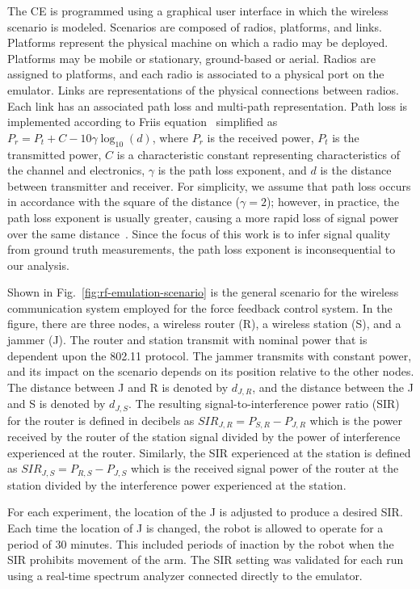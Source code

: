 The CE is programmed using a graphical user interface in which the wireless scenario is modeled.  Scenarios are composed of radios, platforms, and links.  Platforms represent the physical machine on which a radio may be deployed.  Platforms may be mobile or stationary, ground-based or aerial. Radios are assigned to platforms, and each radio is associated to a physical port on the emulator.  Links are representations of the physical connections between radios.  Each link has an associated path loss and multi-path representation.  Path loss is implemented according to Friis equation~\cite{Shaw2013.Frii} simplified as 
$P_r = P_t + C - 10\gamma\log_{10}\left( d \right)$, 
where $P_r$ is the received power, $P_t$ is the transmitted power, $C$ is a characteristic constant representing characteristics of the channel and electronics, $\gamma$ is the path loss exponent, and $d$ is the distance between transmitter and receiver.  For simplicity, we assume that path loss occurs in accordance with the square of the distance ($\gamma=2$); however, in practice, the path loss exponent is usually greater, causing a more rapid loss of signal power over the same distance~\cite{Candell2017.NIST1951}.  Since the focus of this work is to infer signal quality from ground truth measurements, the path loss exponent is inconsequential to our analysis.


Shown in Fig.~\ref{fig:rf-emulation-scenario} is the general scenario for the wireless communication system employed for the force feedback control system.  In the figure, there are three nodes, a wireless router (R), a wireless station (S), and a jammer (J).  The router and station transmit with nominal power that is dependent upon the 802.11 protocol. The jammer transmits with constant power, and its impact on the scenario depends on its position relative to the other nodes.  The distance between J and R is denoted by $d_{J,R}$, and the distance between the J and S is denoted by $d_{J,S}$.  The resulting signal-to-interference power ratio (SIR) for the router is defined in decibels as $SIR_{J,R} = P_{S,R}-P_{J,R}$ which is the power received by the router of the station signal divided by the power of interference experienced at the router.  Similarly, the SIR experienced at the station is defined as $SIR_{J,S} = P_{R,S}-P_{J,S}$ which is the received signal power of the router at the station divided by the interference power experienced at the station.

For each experiment, the location of the J is adjusted to produce a desired SIR.  Each time the location of J is changed, the robot is allowed to operate for a period of 30 minutes.  This included periods of inaction by the robot when the SIR prohibits movement of the arm.  The SIR setting was validated for each run using a real-time spectrum analyzer connected directly to the emulator.

	
	
	
	
	


